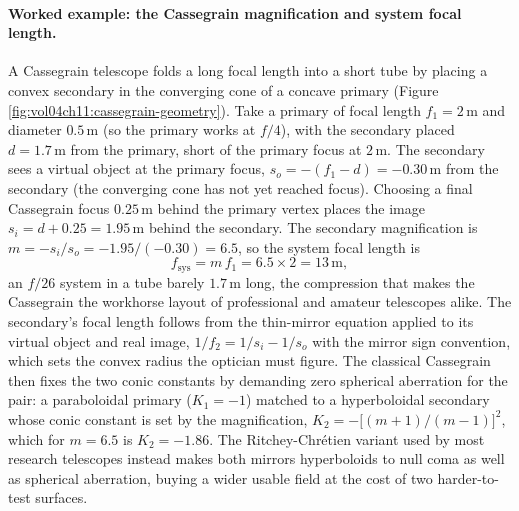\paragraph{Worked example: the Cassegrain magnification and system focal length.}
A Cassegrain telescope folds a long focal length into a short tube by placing a
convex secondary in the converging cone of a concave primary (Figure
\ref{fig:vol04ch11:cassegrain-geometry}). Take a primary of focal length
$f_1 = 2\,\si{\meter}$ and diameter $0.5\,\si{\meter}$ (so the primary works at
$f/4$), with the secondary placed $d = 1.7\,\si{\meter}$ from the primary, short
of the primary focus at $2\,\si{\meter}$. The secondary sees a virtual object at
the primary focus, $s_o = -(f_1 - d) = -0.30\,\si{\meter}$ from the secondary (the
converging cone has not yet reached focus). Choosing a final Cassegrain focus
$0.25\,\si{\meter}$ behind the primary vertex places the image
$s_i = d + 0.25 = 1.95\,\si{\meter}$ behind the secondary. The secondary
magnification is $m = -s_i/s_o = -1.95/(-0.30) = 6.5$, so the system focal length
is
\[
f_{\mathrm{sys}} = m\,f_1 = 6.5\times 2 = 13\,\si{\meter},
\]
an $f/26$ system in a tube barely $1.7\,\si{\meter}$ long, the compression that
makes the Cassegrain the workhorse layout of professional and amateur telescopes
alike. The secondary's focal length follows from the thin-mirror equation applied
to its virtual object and real image, $1/f_2 = 1/s_i - 1/s_o$ with the mirror sign
convention, which sets the convex radius the optician must figure. The classical
Cassegrain then fixes the two conic constants by demanding zero spherical
aberration for the pair: a paraboloidal primary ($K_1 = -1$) matched to a
hyperboloidal secondary whose conic constant is set by the magnification,
$K_2 = -\big[(m+1)/(m-1)\big]^2$, which for $m = 6.5$ is $K_2 = -1.86$. The
Ritchey-Chr\'etien variant used by most research telescopes instead makes both
mirrors hyperboloids to null coma as well as spherical aberration, buying a wider
usable field at the cost of two harder-to-test surfaces.



